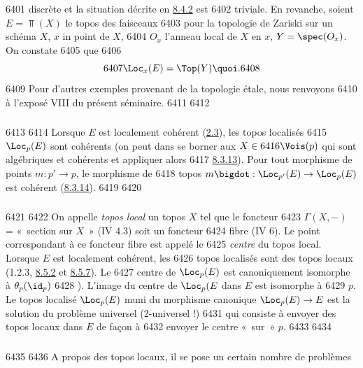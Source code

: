   6401	discrète et la situation décrite en \hyperref[VI.subsubsec8.4.2]{8.4.2} est
  6402	triviale. En revanche, soient $E = \Top(X)$ le topos des faisceaux
  6403	pour la topologie de Zariski sur un schéma $X$, $x$ in point de $X$,
  6404	$O_x$ l'anneau local de $X$ en $x$, $Y = \spec(O_x)$. On constate
  6405	que
  6406	$$
  6407	\Loc_x(E) = \Top(Y){\quoi}.
  6408	$$
  6409	Pour d'autres exemples provenant de la topologie étale, nous renvoyons
  6410	à l'exposé VIII du présent séminaire.
  6411	
  6412	\subsubsection{}
  6413	
  6414	Lorsque $E$ est localement cohérent (\hyperref[VI.def2.3]{2.3}), les topos localisés
  6415	$\Loc_p(E)$ sont cohérents (on peut dans  se borner aux $X \in
  6416	\Vois(p)$ qui sont algébriques et cohérents et appliquer alors
  6417	\hyperref[VI.thm8.3.13]{8.3.13}). Pour tout morphisme de points $m : p'\to p$, le morphisme de
  6418	topos $m\bigdot : \Loc_{p'}(E) \to \Loc_p(E)$ est cohérent (\hyperref[VI.cor8.3.14]{8.3.14}).
  6419	
  6420	\subsubsection{}
  6421	
  6422	On appelle \emph{topos local} un topos $X$ tel que le foncteur
  6423	$\Gamma(X, -)$ = « section sur $X$ » (IV 4.3) soit un foncteur
  6424	fibre (IV 6). Le point correspondant à ce foncteur fibre est appelé le
  6425	\emph{centre} du topos local. Lorsque $E$ est localement cohérent, les
  6426	topos localisés sont des topos locaux (1.2.3, \hyperref[VI.prop8.5.2]{8.5.2} et \hyperref[VI.cor8.5.7]{8.5.7}). Le
  6427	centre de $\Loc_p(E)$ est canoniquement isomorphe à $\theta_p(\id_p)$
  6428	). L'image du centre de $\Loc_p(E$ dans $E$ est isomorphe à
  6429	$p$. Le topos localisé $\Loc_p(E)$ muni du morphisme canonique	$\Loc_p(E) \to E$ est la solution du problème universel (2-universel !)
  6431	qui consiste à envoyer des topos locaux dans $E$ de façon à
  6432	envoyer le centre « sur » $p$.
  6433	
  6434	\subsubsection{}
  6435	
  6436	A propos des topos locaux, il se pose un certain nombre de problèmes

